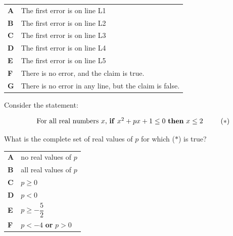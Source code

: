 \documentclass[11pt,a4paper]{article}
\begin{document}
\begin{enumerate}[label=\textbf{\arabic*.},leftmargin=*,itemsep=0pt,start=16]
\par\vspace*{12pt}
\begin{tabularx}{\linewidth}{@{}>{\bfseries}l Y@{}}
A &
The first error is on line L1
\\[0.8em]
B &
The first error is on line L2
\\[0.8em]
C &
The first error is on line L3
\\[0.8em]
D &
The first error is on line L4
\\[0.8em]
E &
The first error is on line L5
\\[0.8em]
F &
There is no error, and the claim is true.
\\[0.8em]
G &
There is no error in any line, but the claim is false.
\\
\end{tabularx}
\end{enumerate}
\clearpage
\thispagestyle{djspaper}
\vspace*{8pt}
\begin{enumerate}[label=\textbf{\arabic*.},leftmargin=*,itemsep=0pt,start=17]
\questionitem[Polynomials]
Consider the statement:

\[ \begin{array}{c}
\text{For all real numbers $x$, \textbf{if} $x^2+px+1\le 0$ \textbf{then} $x\le 2$}
\end{array} \tag{$\ast$} \]

What is the complete set of real values of $p$ for which ($\ast$) is true?

\par\vspace*{12pt}
\begin{tabularx}{\linewidth}{@{}>{\bfseries}l Y@{}}
A &
no real values of $p$
\\[0.8em]
B &
all real values of $p$
\\[0.8em]
C &
$p\ge 0$
\\[0.8em]
D &
$p<0$
\\[0.8em]
E &
$p\ge -\dfrac{5}{2}$
\\[0.8em]
F &
$p<-4$ \textbf{or} $p>0$
\\
\end{tabularx}
\end{enumerate}
\end{document}
